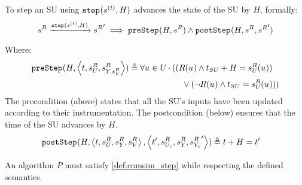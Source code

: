   \begin{definition}\label{def:step}
    To step an SU using $\mathtt{step}_{}(s_{}^{(t)}, H)$ advances the state of the SU by $H$, formally:
    \begin{align*}
      s^{R}_{} 
      \xrightarrow[\text{}]{\mathtt{step}_{}(s_{}^{(t)}, H)} 
      {s^{R}_{}}'
      \implies 
      \mathtt{preStep}_{}(H, s^{R}_{})
      \land
      \mathtt{postStep}_{}(H, s^{R}_{}, {s^{R}_{}}')
    \end{align*}
    Where:
    \begin{align*}
      &\mathtt{preStep}_{}(H,  \left\langle t,s^{R}_{U_{}}, s^{R}_{Y_{}, s^{R}_{V}} \right\rangle ) \triangleq 
      \forall u_{} \in U_{}
      \cdot 
      ((R(u_{}) \land t_{SU} + H = s^{R}_{U_{}}(u_{}))
      \nonumber \\
      &\qquad \qquad \qquad \qquad \qquad \qquad \qquad \qquad \qquad 
      \lor 
      (\neg R(u_{}) \land t_{SU} = s^{R}_{U_{}}(u_{})))
    \end{align*}
    The precondition (above) states that all the SU's inputs have been updated according to their instrumentation.  
    The postcondition (below) ensures that the time of the SU advances by $H$.
    \begin{align*}
      &\mathtt{postStep}_{}(H,  \left\langle t,s^{R}_{U_{}}, s^{R}_{Y_{}}, s^{R}_{V} \right\rangle ,  \left\langle t',s^{R}_{U_{c}}, s^{R}_{Y_{}}, {s^{R}_{V_c}}' \right\rangle ) \triangleq t + H = t'
    \end{align*}
  \end{definition}

An algorithm $P$ must satisfy \cref{def:comsim_step} while respecting the defined semantics.
  

